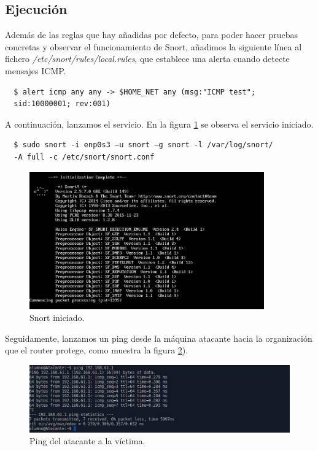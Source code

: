 \documentclass[a4,12pt,onecolum]{article}
\begin{document}
\subsection{Ejecución}

Además de las reglas que hay añadidas por defecto, para poder hacer pruebas concretas y observar el funcionamiento de Snort, añadimos la siguiente línea al fichero \emph{/etc/snort/rules/local.rules}, que establece una alerta cuando detecte mensajes ICMP.

\begin{verbatim}
  $ alert icmp any any -> $HOME_NET any (msg:"ICMP test";
  sid:10000001; rev:001)
\end{verbatim}

A continuación, lanzamos el servicio. En la figura \ref{fig:snort2} se observa el servicio iniciado.

\begin{verbatim}
  $ sudo snort -i enp0s3 –u snort –g snort -l /var/log/snort/
  -A full -c /etc/snort/snort.conf
\end{verbatim}

\begin{figure}[H]
\centering
\includegraphics[width=0.9\textwidth]{./images/SnortInicio.png}
\caption{Snort iniciado.}
\label{fig:snort2}
\end{figure}

Seguidamente, lanzamos un ping desde la máquina atacante hacia la organización que el router protege, como muestra la figura \ref{fig:snort3}).

\begin{figure}[H]
\centering
\includegraphics[width=1.0\textwidth]{./images/SnortPing.png}
\caption{Ping del atacante a la víctima.}
\label{fig:snort3}
\end{figure}
\end{document}
